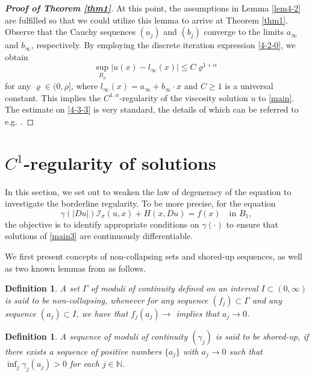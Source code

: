 \documentclass[11pt,reqno]{amsart}
\numberwithin{equation}{section}
\newtheorem{definition}[theorem]{Definition}
\begin{document}
\begin{proof}[\textbf{Proof of Theorem \ref{thm1}}]
At this point, the assumptions in Lemma \ref{lem4-2} are fulfilled so that we could utilize this lemma to arrive at Theorem \ref{thm1}. Observe that the Cauchy sequences $(a_j)$ and $(b_j)$ converge to the limits $a_\infty$ and $b_\infty$, respectively. By employing the discrete iteration expression \eqref{4-2-0}, we obtain
\begin{equation}
\label{4-3-3}
\sup_{B_\varrho}|u(x)-l_\infty(x)|\le C\varrho^{1+\alpha}
\end{equation}
for any $\varrho\in(0,\rho]$, where $l_\infty(x)=a_\infty+b_\infty\cdot x$ and $C\ge1$ is a universal constant.
This implies the $C^{1,\alpha}$-regularity of the viscosity solution $u$ to \eqref{main}.
The estimate on \eqref{4-3-3} is very standard, the details of which can be referred to e.g. \cite{FRZ21,APS24}.
\end{proof}

\section{$C^1$-regularity of solutions}
\label{sec5}

In this section, we set out to weaken the law of degeneracy of the equation to investigate the borderline regularity. To be more precise, for the equation
\begin{equation}
\label{main3}
\gamma(|Du|)\mathcal{I}_\sigma(u,x)+H(x,Du)=f(x) \quad\text{in } B_1,
\end{equation}
the objective is to identify appropriate conditions on $\gamma(\cdot)$ to ensure that solutions of \eqref{main3} are continuously differentiable.

We first present concepts of non-collapsing sets and shored-up sequences, as well as two known lemmas from \cite{APPT22} as follows.

\begin{definition}%
\label{def5-1}
A set $\Gamma$ of moduli of continuity defined on an interval $I\subset(0,\infty)$ is said to be non-collapsing, whenever for any sequence $(f_j)\subset\Gamma$ and any sequence $(a_j)\subset I$, we have that $f_j(a_j)\rightarrow$ implies that $a_j\rightarrow0$.
\end{definition}

\begin{definition}%
\label{def5-2}
A sequence of moduli of continuity $(\gamma_j)$ is said to be shored-up, if there exists a sequence of positive numbers $\{a_j\}$ with $a_j\rightarrow0$ such that
$\inf_j\gamma_j(a_j)>0$ for each $j\in\mathbb{N}$.
\end{definition}
\end{document}
